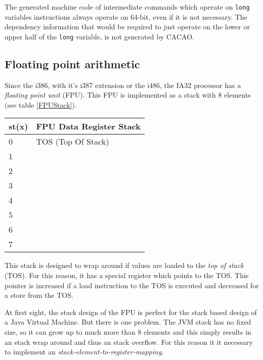The generated machine code of intermediate commands which operate on
\texttt{long} variables instructions always operate on 64-bit, even if
it is not necessary. The dependency information that would be required
to just operate on the lower or upper half of the \texttt{long}
variable, is not generated by CACAO.


\subsection{Floating point arithmetic}
\label{ia32floatingpointarithmetic}

Since the i386, with it's i387 extension or the i486, the IA32
processor has a \textit{floating point unit} (FPU). This FPU is
implemented as a stack with 8 elements (see table \ref{FPUStack}).

\begin{table*}
\begin{center}
\begin{tabular}[b]{|l|l|}
\hline 
st(x) & FPU Data Register Stack \\ \hline
0     & TOS (Top Of Stack) \\ \hline
1     & \\ \hline
2     & \\ \hline
3     & \\ \hline
4     & \\ \hline
5     & \\ \hline
6     & \\ \hline
7     & \\ \hline
\end{tabular}
\caption{x87 FPU Data Register Stack}
\label{FPUStack}
\end{center}
\end{table*}

This stack is designed to wrap around if values are loaded to the
\textit{top of stack} (TOS). For this reason, it has a special register which
points to the TOS. This pointer is increased if a load instruction to
the TOS is executed and decreased for a store from the TOS.

At first sight, the stack design of the FPU is perfect for the stack
based design of a Java Virtual Machine. But there is one problem. The
JVM stack has no fixed size, so it can grow up to much more than 8
elements and this simply results in an stack wrap around and thus an
stack overflow. For this reason it it necessary to implement an
\textit{stack-element-to-register-mapping}.

